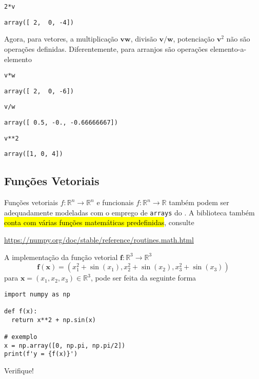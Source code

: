 \begin{ex}
\begin{lstlisting}
2*v
\end{lstlisting}

\begin{verbatim}
array([ 2,  0, -4])
\end{verbatim}

  Agora, para vetores, a multiplicação $\pmb{v}\pmb{w}$, divisão $\pmb{v}/\pmb{w}$, potenciação $\pmb{v}^2$ não são operações definidas. Diferentemente, para arranjos são operações elemento-a-elemento

\begin{lstlisting}
v*w
\end{lstlisting}

\begin{verbatim}
array([ 2,  0, -6])
\end{verbatim}

\begin{lstlisting}
v/w
\end{lstlisting}

\begin{verbatim}
array([ 0.5, -0., -0.66666667])
\end{verbatim}

\begin{lstlisting}
v**2
\end{lstlisting}

\begin{verbatim}
array([1, 0, 4])
\end{verbatim}

\end{ex}

\subsection{Funções Vetoriais}

Funções vetoriais $f:\mathbb{R}^n\to\mathbb{R}^n$ e funcionais $f:\mathbb{R}^n\to\mathbb{R}$ também podem ser adequadamente modeladas com o emprego de \texttt{arrays} do \hl{{\numpy}}. A biblioteca também \hl{conta com várias funções matemáticas predefinidas}, consulte
\begin{center}
  \url{https://numpy.org/doc/stable/reference/routines.math.html}
\end{center}

\begin{ex}
  A implementação da função vetorial $\pmb{f}:\mathbb{R}^3\to\mathbb{R}^3$
  \begin{equation}
    \pmb{f}(\pmb{x}) = (x_1^2+\sin(x_1), x_2^2+\sin(x_2), x_3^2+\sin(x_3))
  \end{equation}
  para $\pmb{x} = (x_1, x_2, x_3)\in\mathbb{R}^3$, pode ser feita da seguinte forma

\begin{lstlisting}
import numpy as np

def f(x):
  return x**2 + np.sin(x)

# exemplo
x = np.array([0, np.pi, np.pi/2])
print(f'y = {f(x)}')
\end{lstlisting}

Verifique!
\end{ex}


